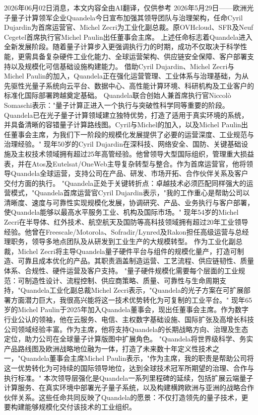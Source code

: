 \documentclass[12pt,a4paper]{ctexart}
\begin{document}
2026年06月02日消息，本文内容全由AI翻译，仅供参考
2026年5月29日——欧洲光子量子计算领军企业Quandela今日宣布加强其领导团队与治理架构，任命Cyril Dujardin为首席运营官、Michel Zecri为工业化副总裁。原OVHcloud、SFR及Neuf Cegetel首席执行官Michel Paulin出任董事会主席。
上述任命标志着Quandela进入全新发展阶段。随着量子计算步入更强调执行力的时期，成功不仅取决于科学性能，更需具备复杂硬件工业化能力、全球运营架构、供应链安全保障、客户部署支持以及规模化可信基础设施构建能力。
借助Cyril Dujardin、Michel Zecri与Michel Paulin的加入，Quandela正在强化运营管理、工业体系与治理基础，为从先驱性光量子系统向云平台、数据中心、高性能计算环境、科研机构及工业客户的标准化国际部署跨越奠定基础。
Quandela联合创始人兼首席执行官Niccolò Somaschi表示："量子计算正进入一个执行与突破性科学同等重要的阶段。Quandela已在光子量子计算领域建立独特优势，打造了适用于真实环境的系统，并具备清晰的容错量子计算路线图。Cyril与Michel的加入，以及Michel Paulin出任董事会主席，为我们下一阶段的规模化发展提供了必要的运营深度、工业规范与治理经验。"
现年50岁的Cyril Dujardin在深科技、网络安全、国防、关键基础设施及主权技术领域拥有超过25年高管经验。他曾领导大型国际组织，管理重大损益表，并在Atos及Eutelsat/OneWeb主导复杂转型与整合。作为首席运营官，他将领导Quandela全球运营，支持公司在产品、研发、市场开拓、合作伙伴关系及客户交付方面的执行。
"Quandela正处于关键转折点：卓越技术必须匹配同样强大的运营模式，"Quandela首席运营官Cyril Dujardin表示，"我的工作重心是帮助公司以清晰度、速度与可靠性实现规模化发展，协调研究、产品、业务执行与客户部署，使Quandela能够以最高水平服务工业、机构及国际市场。"
现年54岁的Michel Zecri在半导体、红外技术、航空航天及国防等高科技领域拥有超过20年工业领导经验。他曾在Freescale/Motorola、Sofradir/Lynred及Rakon担任高级运营与总经理职务，领导多地点团队及从研发到工业生产的大规模转型。
作为工业化副总裁，Michel Zecri将主导Quandela量子硬件平台与组件的规模化量产，打造可制造、可靠且成本优化的产品。其职责涵盖制造运营、工艺流程、供应链韧性、质量体系、合规性、硬件运营及客户支持。
"量子硬件规模化需要每个层面的工业规范：可制造性设计、流程控制、供应商策略、质量、可靠性与生命周期支持，"Quandela工业化副总裁Michel Zecri表示，"Quandela的光子方案在可扩展部署方面潜力巨大，我很高兴能将这一技术优势转化为可复制的工业平台。"
现年65岁的Michel Paulin于2025年加入Quandela董事会，现出任董事会主席。作为数字行业公认的领袖，他在云服务、电信、主权数字基础设施、国际扩张及高增长科技公司领域经验丰富。作为主席，他将支持Quandela的长期战略方向、治理及生态定位，助力公司在全球量子计算版图中扩展角色。
"Quandela将世界级科学、务实产品路线图及欧洲战略地位融为一体，打造了未来数十年定义性技术之一，"Quandela董事会主席Michel Paulin表示，"作为主席，我的职责是帮助公司将这一优势转化为可持续的国际领导地位，达到全球技术冠军所期望的治理、合作与执行标准。"
本次领导层强化是Quandela一系列里程碑的延续，包括扩展云端量子计算服务、在真实环境中部署光子量子系统，以及构建横跨欧洲与亚洲的战略合作伙伴关系。这些任命共同反映了Quandela的愿景：不仅打造领先的量子技术，更要构建能够规模化交付该技术的工业组织。
\end{document}

